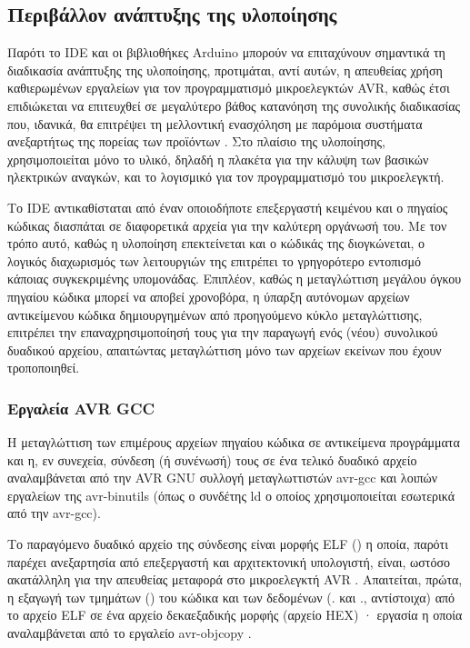 \subsection{Περιβάλλον ανάπτυξης της υλοποίησης}

Παρότι το IDE και οι βιβλιοθήκες Arduino μπορούν να επιταχύνουν σημαντικά τη
διαδικασία ανάπτυξης της υλοποίησης, προτιμάται, αντί αυτών, η απευθείας χρήση
καθιερωμένων εργαλείων για τον προγραμματισμό μικροελεγκτών AVR, καθώς έτσι
επιδιώκεται να επιτευχθεί σε μεγαλύτερο βάθος κατανόηση της συνολικής
διαδικασίας που, ιδανικά, θα επιτρέψει τη μελλοντική ενασχόληση με παρόμοια
συστήματα ανεξαρτήτως της πορείας των προϊόντων . Στο πλαίσιο της
υλοποίησης, χρησιμοποιείται μόνο το υλικό, δηλαδή η πλακέτα  για την
κάλυψη των βασικών ηλεκτρικών αναγκών, και το λογισμικό  για τον
προγραμματισμό του μικροελεγκτή.

Το IDE αντικαθίσταται από έναν οποιοδήποτε επεξεργαστή κειμένου και ο πηγαίος
κώδικας διασπάται σε διαφορετικά αρχεία για την καλύτερη οργάνωσή του.
Με τον τρόπο αυτό, καθώς η υλοποίηση επεκτείνεται και ο κώδικάς της διογκώνεται,
ο λογικός διαχωρισμός των λειτουργιών της επιτρέπει το γρηγορότερο εντοπισμό
κάποιας συγκεκριμένης υπομονάδας. Επιπλέον, καθώς η μεταγλώττιση μεγάλου όγκου
πηγαίου κώδικα μπορεί να αποβεί χρονοβόρα, η ύπαρξη αυτόνομων αρχείων
αντικείμενου κώδικα δημιουργημένων από προηγούμενο κύκλο μεταγλώττισης,
επιτρέπει την επαναχρησιμοποίησή τους για την παραγωγή ενός (νέου) συνολικού
δυαδικού αρχείου, απαιτώντας μεταγλώττιση μόνο των αρχείων εκείνων που έχουν
τροποποιηθεί.


\subsubsection{Εργαλεία AVR GCC}

Η μεταγλώττιση των επιμέρους αρχείων πηγαίου κώδικα σε αντικείμενα προγράμματα
και η, εν συνεχεία, σύνδεση (ή συνένωσή) τους σε ένα τελικό δυαδικό αρχείο
αναλαμβάνεται από την AVR GNU συλλογή μεταγλωττιστών avr-gcc και λοιπών
εργαλείων της avr-binutils (όπως ο συνδέτης ld ο οποίος χρησιμοποιείται
εσωτερικά από την avr-gcc).

Το παραγόμενο δυαδικό αρχείο της σύνδεσης είναι μορφής ELF () η οποία, παρότι παρέχει ανεξαρτησία από επεξεργαστή και
αρχιτεκτονική υπολογιστή, είναι, ωστόσο ακατάλληλη για την απευθείας μεταφορά
στο μικροελεγκτή AVR \parencites[47]{cruz97}[346]{avrlibc}. Απαιτείται, πρώτα, η
εξαγωγή των τμημάτων () του κώδικα και των δεδομένων (\@.
και \@., αντίστοιχα) από το αρχείο ELF σε ένα αρχείο δεκαεξαδικής
μορφής (αρχείο HEX) · εργασία η οποία αναλαμβάνεται από το εργαλείο avr-objcopy
\parencite[13,346]{avrlibc}.

